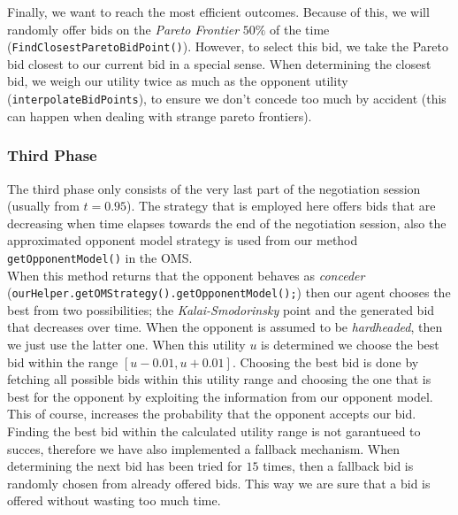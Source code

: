 Finally, we want to reach the most efficient outcomes. Because of this,
we will randomly offer bids on the \emph{Pareto Frontier} $50\%$ of the time (\verb-FindClosestParetoBidPoint()-).
However, to select this bid, we take the Pareto bid closest to our current bid in a special sense.
When determining the closest bid, we weigh our utility twice as much
as the opponent utility (\verb-interpolateBidPoints-), to ensure we don't concede too much by accident 
(this can happen when dealing with strange pareto frontiers).

\subsubsection{Third Phase}

The third phase only consists of the very last part of the negotiation session (usually from $t=0.95$). The strategy that is employed here offers bids that are decreasing when time elapses towards the end of the negotiation session, also the approximated opponent model strategy is used from our method \texttt{getOpponentModel()} in the OMS. \\

When this method returns that the opponent behaves as \emph{conceder} (\verb-ourHelper.getOMStrategy().getOpponentModel();-) then our agent chooses the best from two possibilities; the \emph{Kalai-Smodorinsky} point and the generated bid that decreases over time. When the opponent is assumed to be \emph{hardheaded}, then we just use the latter one. When this utility $u$ is determined we choose the best bid within the range $[u-0.01, u+0.01]$. Choosing the best bid is done by fetching all possible bids within this utility range and choosing the one that is best for the opponent by exploiting the information from our opponent model. This of course, increases the probability that the opponent accepts our bid. \\

Finding the best bid within the calculated utility range is not garantueed to succes, therefore we have also implemented a fallback mechanism. When determining the next bid has been tried for $15$ times, then a fallback bid is randomly chosen from already offered bids. This way we are sure that a bid is offered without wasting too much time.

